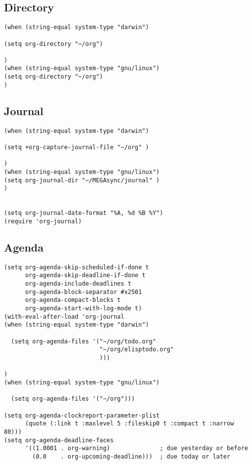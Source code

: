 \documentclass[11pt]{article}
\begin{document}
\subsection{Directory}
\label{sec:org9ecbe1a}
\begin{verbatim}
(when (string-equal system-type "darwin")

(setq org-directory "~/org")

)
(when (string-equal system-type "gnu/linux")
(setq org-directory "~/org")
)

\end{verbatim}
\subsection{Journal}
\label{sec:orgaf26527}
\begin{verbatim}
(when (string-equal system-type "darwin")

(setq +org-capture-journal-file "~/org" )

)
(when (string-equal system-type "gnu/linux")
(setq org-journal-dir "~/MEGAsync/journal" )
)


(setq org-journal-date-format "%A, %d %B %Y")
(require 'org-journal)

\end{verbatim}
\subsection{Agenda}
\label{sec:org529cd75}

\begin{verbatim}
(setq org-agenda-skip-scheduled-if-done t
      org-agenda-skip-deadline-if-done t
      org-agenda-include-deadlines t
      org-agenda-block-separator #x2501
      org-agenda-compact-blocks t
      org-agenda-start-with-log-mode t)
(with-eval-after-load 'org-journal
(when (string-equal system-type "darwin")

  (setq org-agenda-files '("~/org/todo.org"
                           "~/org/elisptodo.org"
                           )))

)
(when (string-equal system-type "gnu/linux")

  (setq org-agenda-files '("~/org")))

(setq org-agenda-clockreport-parameter-plist
      (quote (:link t :maxlevel 5 :fileskip0 t :compact t :narrow 80)))
(setq org-agenda-deadline-faces
      '((1.0001 . org-warning)              ; due yesterday or before
        (0.0    . org-upcoming-deadline)))  ; due today or later

\end{verbatim}
\end{document}
